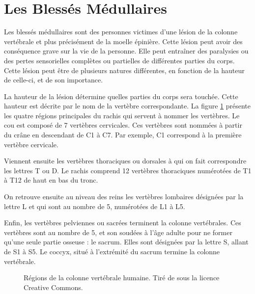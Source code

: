 \documentclass[letterpaper, twoside, 12pt, memoire, creativecommons, hyperref]{thETS}
\begin{document}
\section{Les Blessés Médullaires}

Les blessés médullaires sont des personnes victimes d'une lésion de la colonne vertébrale et plus précisément de la moelle épinière. Cette lésion peut avoir des conséquence grave sur la vie de la personne. Elle peut entraîner des paralysies ou des pertes sensorielles complètes ou partielles de différentes parties du corps. Cette lésion peut être de plusieurs natures différentes, en fonction de la hauteur de celle-ci, et de son importance. 

La hauteur de la lésion détermine quelles parties du corps sera touchée. Cette hauteur est décrite par le nom de la vertèbre correspondante. La figure \ref{fig:rachis} présente les quatre régions principales du rachis qui servent à nommer les vertèbres. Le cou est composé de 7 vertèbres cervicales. Ces vertèbres sont nommées à partir du crâne en descendant de C1 à C7. Par exemple, C1 correspond à la première vertèbre cervicale. 

Viennent ensuite les vertèbres thoraciques ou dorsales à qui on fait correspondre les lettres T ou D. Le rachis comprend 12 vertèbres thoraciques numérotées de T1 à T12 de haut en bas du tronc. 

On retrouve ensuite au niveau des reins les vertèbres lombaires désignées par la lettre L et qui sont au nombre de 5, numérotées de L1 à L5. 

Enfin, les vertèbres pelviennes ou sacrées terminent la colonne vertébrales. Ces vertèbres sont au nombre de 5, et son soudées à l'âge adulte pour ne former qu'une seule partie osseuse : le sacrum. Elles sont désignées par la lettre S, allant de S1 à S5. Le coccyx, situé à l'extrémité du sacrum termine la colonne vertébrale.

\begin{figure}
	\centering
	\caption{Régions de la colonne vertébrale humaine. Tiré de \cite{rachisWiki} sous la licence Creative Commons.}
	\label{fig:rachis}
\end{figure}
\end{document}
